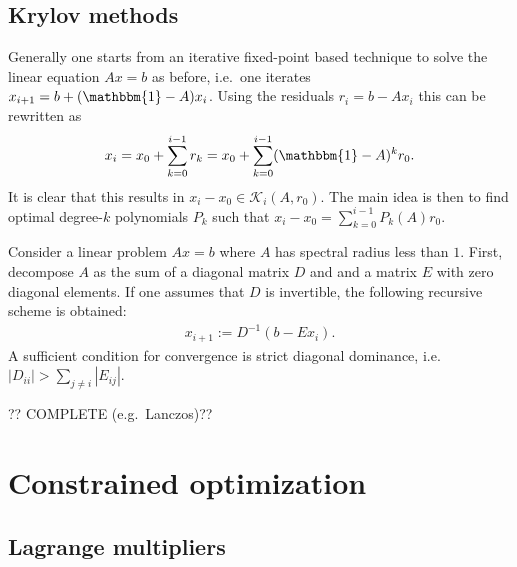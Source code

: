 \subsection{Krylov methods}

    Generally one starts from an iterative fixed-point based technique to solve the linear equation $Ax=b$ as before, i.e.~one iterates $x_{i+1} = b + (\mathbbm{1}-A)x_i$. Using the residuals $r_i = b - Ax_i$ this can be rewritten as
    \begin{gather}
        x_i = x_0 + \sum_{k=0}^{i-1}r_k = x_0 + \sum_{k=0}^{i-1}(\mathbbm{1}-A)^kr_0.
    \end{gather}
    It is clear that this results in $x_i-x_0\in\mathcal{K}_i(A,r_0)$. The main idea is then to find optimal degree-$k$ polynomials $P_k$ such that $x_i-x_0=\sum_{k=0}^{i-1}P_k(A)r_0$.

    \begin{method}
        Consider a linear problem $Ax=b$ where $A$ has spectral radius less than $1$. First, decompose $A$ as the sum of a diagonal matrix $D$ and and a matrix $E$ with zero diagonal elements. If one assumes that $D$ is invertible, the following recursive scheme is obtained:
        \begin{gather}
            x_{i+1} := D^{-1}(b-Ex_i).
        \end{gather}
        A sufficient condition for convergence is strict diagonal dominance, i.e.~$|D_{ii}|>\sum_{j\neq i}|E_{ij}|$.
    \end{method}

    ?? COMPLETE (e.g.~Lanczos)??

\section{Constrained optimization}
\subsection{Lagrange multipliers}

